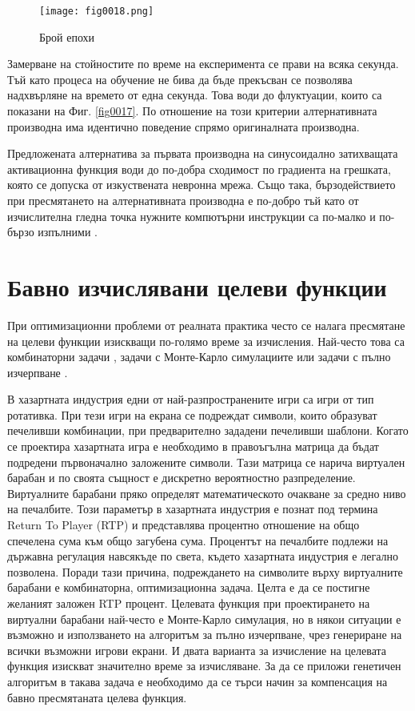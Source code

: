 \begin{figure}[H]
  \centering
  \texttt{[image: fig0018.png]}
  \caption{Брой епохи}
\label{fig0018}
\end{figure}

Замерване на стойностите по време на експеримента се прави на всяка секунда. Тъй като процеса на обучение не бива да бъде прекъсван се позволява надхвърляне на времето от една секунда. Това води до флуктуации, които са показани на Фиг. \ref{fig0017}. По отношение на този критерии алтернативната производна има идентично поведение спрямо оригиналната производна.

Предложената алтернатива за първата производна на синусоидално затихващата активационна функция води до по-добра сходимост по градиента на грешката, която се допуска от изкуствената невронна мрежа. Също така, бързодействието при пресмятането на алтернативната производна е по-добро тъй като от изчислителна гледна точка нужните компютърни инструкции са по-малко и по-бързо изпълними \cite{Zankinski-01}.

\section{Бавно изчислявани целеви функции}

При оптимизационни проблеми от реалната практика често се налага пресмятане на целеви функции изискващи по-голямо време за изчисления. Най-често това са комбинаторни задачи \cite{Koleva-01}, задачи с Монте-Карло симулациите или задачи с пълно изчерпване \cite{Keremedchiev-01}.

В хазартната индустрия едни от най-разпространените игри са игри от тип ротативка. При тези игри на екрана се подреждат символи, които образуват печеливши комбинации, при предварително зададени печеливши шаблони. Когато се проектира хазартната игра е необходимо в правоъгълна матрица да бъдат подредени първоначално заложените символи. Тази матрица се нарича виртуален барабан и по своята същност е дискретно вероятностно разпределение. Виртуалните барабани пряко определят математическото очакване за средно ниво на печалбите. Този параметър в хазартната индустрия е познат под термина Return To Player (RTP) и представлява процентно отношение на общо спечелена сума към общо загубена сума. Процентът на печалбите подлежи на държавна регулация навсякъде по света, където хазартната индустрия е легално позволена. Поради тази причина, подреждането на символите върху виртуалните барабани е комбинаторна, оптимизационна задача. Целта е да се постигне желаният заложен RTP процент. Целевата функция при проектирането на виртуални барабани най-често е Монте-Карло симулация, но в някои ситуации е възможно и използването на алгоритъм за пълно изчерпване, чрез генериране на всички възможни игрови екрани. И двата варианта за изчисление на целевата функция изискват значително време за изчисляване. За да се приложи генетичен алгоритъм в такава задача е необходимо да се търси начин за компенсация на бавно пресмятаната целева функция. 


